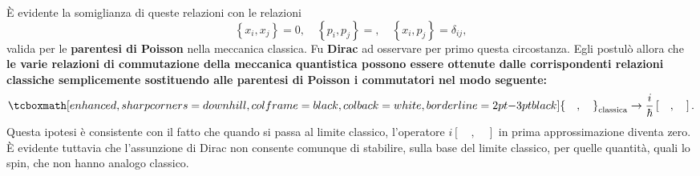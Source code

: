 \documentclass[a4paper,12pt,oneside]{book}
\begin{document}
È evidente la somiglianza di queste relazioni con le relazioni
	\begin{equation}
		\left\{ x_i, x_j\right\}=0,\quad \left\{ p_i, p_j\right\}=, \quad \left\{ x_i, p_j\right\}=\delta _{ij}, 
\end{equation}
valida per le \textbf{parentesi di Poisson} nella meccanica classica. Fu \textbf{Dirac} ad osservare per primo questa circostanza. Egli postulò allora che \textbf{le varie relazioni di commutazione della meccanica quantistica possono essere ottenute dalle corrispondenti relazioni classiche semplicemente sostituendo alle parentesi di Poisson i commutatori nel modo seguente:}
	\begin{equation}
		\tcboxmath[enhanced, sharp corners=downhill, colframe=black, colback=white, borderline={2pt}{-3pt}{black}]{
			\left\{ \quad, \quad \right\} _{\textrm{classica}} \rightarrow \frac{i}{\hbar}\left[ \quad, \quad \right] .
			}
	\end{equation}
Questa ipotesi è consistente con il fatto che quando si passa al limite classico, l'operatore $i\left[ \quad, \quad \right]$ in prima approssimazione diventa zero.\\

È evidente tuttavia che l'assunzione di Dirac non consente comunque di stabilire, sulla base del limite classico, per quelle quantità, quali lo spin, che non hanno analogo classico.
\end{document}
